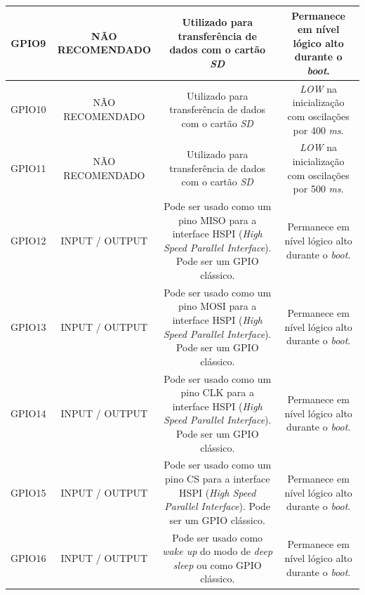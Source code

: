 \begin{anexosenv}
\begin{center}
\begin{longtable}{c|c|c|c}
		GPIO9 & NÃO RECOMENDADO & \multicolumn{1}{m{5cm}|}{Utilizado para transferência de dados com o cartão \textit{SD}} & \multicolumn{1}{m{4cm}}{Permanece em nível lógico alto durante o \textit{boot}.}\\ \hline
		
		GPIO10 & NÃO RECOMENDADO & \multicolumn{1}{m{5cm}|}{Utilizado para transferência de dados com o cartão \textit{SD}} & \multicolumn{1}{m{4cm}}{\textit{LOW} na inicialização com oscilações por 400 \textit{ms}.}\\ \hline
		
		GPIO11 & NÃO RECOMENDADO & \multicolumn{1}{m{5cm}|}{Utilizado para transferência de dados com o cartão \textit{SD}} & \multicolumn{1}{m{4cm}}{\textit{LOW} na inicialização com oscilações por 500 \textit{ms}.}\\ \hline
		
		GPIO12 & INPUT / OUTPUT & \multicolumn{1}{m{5cm}|}{Pode ser usado como um pino MISO para a interface HSPI (\textit{High Speed Parallel Interface}). Pode ser um GPIO clássico.} & \multicolumn{1}{m{4cm}}{Permanece em nível lógico alto durante o \textit{boot}.}\\ \hline
		
		GPIO13 & INPUT / OUTPUT & \multicolumn{1}{m{5cm}|}{Pode ser usado como um pino MOSI para a interface HSPI (\textit{High Speed Parallel Interface}). Pode ser um GPIO clássico.} & \multicolumn{1}{m{4cm}}{Permanece em nível lógico alto durante o \textit{boot}.}\\ \hline
		
		GPIO14 & INPUT / OUTPUT & \multicolumn{1}{m{5cm}|}{Pode ser usado como um pino CLK para a interface HSPI (\textit{High Speed Parallel Interface}). Pode ser um GPIO clássico.} & \multicolumn{1}{m{4cm}}{Permanece em nível lógico alto durante o \textit{boot}.}\\ \hline
		
		GPIO15 & INPUT / OUTPUT & \multicolumn{1}{m{5cm}|}{Pode ser usado como um pino CS para a interface HSPI (\textit{High Speed Parallel Interface}). Pode ser um GPIO clássico.} & \multicolumn{1}{m{4cm}}{Permanece em nível lógico alto durante o \textit{boot}.}\\ \hline
		
		GPIO16 & INPUT / OUTPUT & \multicolumn{1}{m{5cm}|}{Pode ser usado como \textit{wake up} do modo de \textit{deep sleep} ou como GPIO clássico.} & \multicolumn{1}{m{4cm}}{Permanece em nível lógico alto durante o \textit{boot}.}\\ \hline
		

\end{longtable}
\end{center}
\end{anexosenv}
